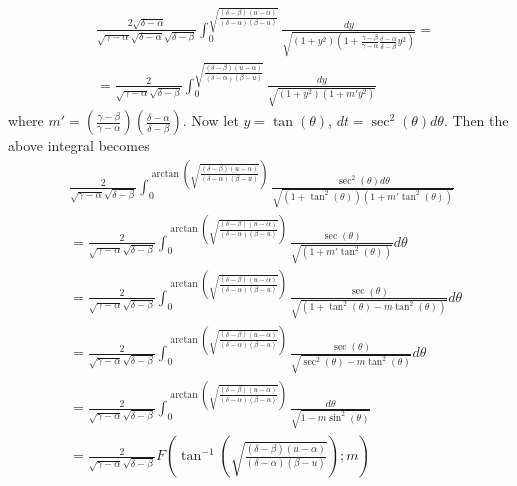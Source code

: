 \documentclass{article}
\begin{document}
\begin{itemize}
\begin{itemize}
        \begin{align*}
            &\frac{2\sqrt{\delta - \alpha}}{\sqrt{\gamma - \alpha}\sqrt{\delta - \alpha}\sqrt{\delta - \beta}}\int_0^{\sqrt{\frac{(\delta - \beta)(u - \alpha)}{(\delta - \alpha)(\beta - u)}}} \frac{dy}{\sqrt{(1 + y^2)\left(1 + \frac{\gamma - \beta}{\gamma - \alpha}\frac{\delta - \alpha}{\delta - \beta}y^2\right)}} =\\
            &= \frac{2}{\sqrt{\gamma - \alpha}\sqrt{\delta - \beta}}\int_0^{\sqrt{\frac{(\delta - \beta)(u - \alpha)}{(\delta - \alpha)(\beta - u)}}}\frac{dy}{\sqrt{(1 + y^2)(1 + m'y^2)}}
        \end{align*}
        where $m' = \left(\frac{\gamma - \beta}{\gamma - \alpha}\right)\left(\frac{\delta - \alpha}{\delta - \beta}\right)$. Now let $y = \tan(\theta)$, $dt = \sec^2(\theta)d\theta$. Then the above integral becomes
        \begin{align*}
            &\frac{2}{\sqrt{\gamma - \alpha}\sqrt{\delta - \beta}}\int_0^{\arctan\left(\sqrt{\frac{(\delta - \beta)(u - \alpha)}{(\delta - \alpha)(\beta - u)}}\right)} \frac{\sec^2(\theta)d\theta}{\sqrt{(1 + \tan^2(\theta))(1 + m'\tan^2(\theta))}}\\
            &= \frac{2}{\sqrt{\gamma - \alpha}\sqrt{\delta - \beta}}\int_0^{\arctan\left(\sqrt{\frac{(\delta - \beta)(u - \alpha)}{(\delta - \alpha)(\beta - u)}}\right)}\frac{\sec(\theta)}{\sqrt{(1 + m'\tan^2(\theta))}}d\theta\\
            &= \frac{2}{\sqrt{\gamma - \alpha}\sqrt{\delta - \beta}}\int_0^{\arctan\left(\sqrt{\frac{(\delta - \beta)(u - \alpha)}{(\delta - \alpha)(\beta - u)}}\right)}\frac{\sec(\theta)}{\sqrt{(1  + \tan^2(\theta) - m\tan^2(\theta))}}d\theta\\
            &= \frac{2}{\sqrt{\gamma - \alpha}\sqrt{\delta - \beta}}\int_0^{\arctan\left(\sqrt{\frac{(\delta - \beta)(u - \alpha)}{(\delta - \alpha)(\beta - u)}}\right)}\frac{\sec(\theta)}{\sqrt{\sec^2(\theta) - m\tan^2(\theta)}}d\theta\\
            &= \frac{2}{\sqrt{\gamma - \alpha}\sqrt{\delta - \beta}}\int_0^{\arctan\left(\sqrt{\frac{(\delta - \beta)(u - \alpha)}{(\delta - \alpha)(\beta - u)}}\right)}\frac{d\theta}{\sqrt{1 - m\sin^2(\theta)}}\\
            &= \frac{2}{\sqrt{\gamma - \alpha}\sqrt{\delta - \beta}}F\left(\tan^{-1}\left(\sqrt{\frac{(\delta - \beta)(u - \alpha)}{(\delta - \alpha)(\beta - u)}}\right); m\right)
        \end{align*}
        

\end{itemize}
\end{itemize}
\end{document}
